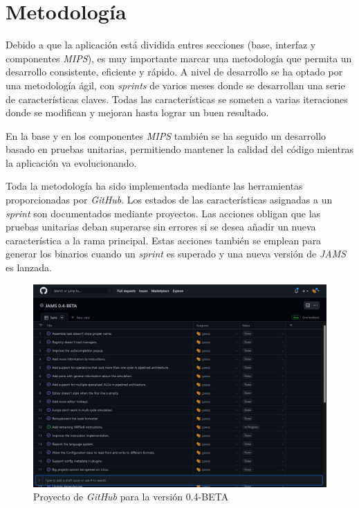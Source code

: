 \section{Metodología}\label{sec:metodologia}

Debido a que la aplicación está dividida entres secciones (base, interfaz y componentes \textit{MIPS}),
es muy importante marcar una metodología que permita un desarrollo consistente, eficiente y rápido.
A nivel de desarrollo se ha optado por una metodología ágil, con \textit{sprints} de varios meses
donde se desarrollan una serie de características claves.
Todas las características se someten a varias iteraciones donde se modifican y mejoran hasta lograr un
buen resultado.

\noindent En la base y en los componentes \textit{MIPS} también se ha seguido un
desarrollo basado en pruebas unitarias, permitiendo mantener la calidad del código mientras la
aplicación va evolucionando.

\noindent Toda la metodología ha sido implementada mediante las herramientas proporcionadas por \textit{GitHub}.
Los estados de las características asignadas a un \textit{sprint} son documentados mediante proyectos.
Las acciones obligan que las pruebas unitarias deban superarse sin errores si se desea añadir un nueva
característica a la rama principal.
Estas acciones también se emplean para generar los binarios cuando un \textit{sprint} es superado y una
nueva versión de \textit{JAMS} es lanzada.

\begin{figure}[H]
    \centering
    \includegraphics[width=\textwidth]{images/introduction/github}
    \caption{Proyecto de \textit{GitHub} para la versión 0.4-BETA}
    \label{fig:introduccion-github}
\end{figure}